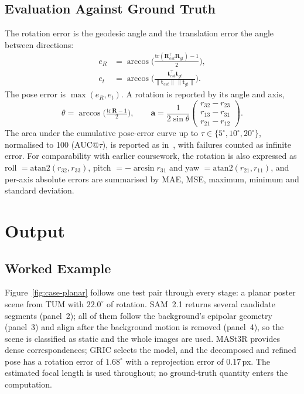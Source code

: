\documentclass[journal]{IEEEtran}
\newcommand{\R}{\mathbf{R}}
\newcommand{\tv}{\mathbf{t}}
\begin{document}
\subsection{Evaluation Against Ground Truth}
The rotation error is the geodesic angle and the translation error the angle between directions:
\begin{align}
  e_R &= \arccos\!\Big(\tfrac{\mathrm{tr}(\R_{est}^\top\R_{gt})-1}{2}\Big),\\
  e_t &= \arccos\!\Big(\tfrac{\tv_{est}^\top\tv_{gt}}{\|\tv_{est}\|\,\|\tv_{gt}\|}\Big).
\end{align}
The pose error is $\max(e_R,e_t)$. A rotation is reported by its angle and axis,
\begin{equation}
  \theta=\arccos\!\Big(\tfrac{\mathrm{tr}\,\R-1}{2}\Big),\qquad \mathbf{a}=\frac{1}{2\sin\theta}\begin{pmatrix}r_{32}-r_{23}\\ r_{13}-r_{31}\\ r_{21}-r_{12}\end{pmatrix}.
\end{equation} The area under the cumulative pose-error curve up to $\tau\in\{5^\circ,10^\circ,20^\circ\}$, normalised to 100 (AUC@$\tau$), is reported as in~\cite{superglue,loftr}, with failures counted as infinite error. For comparability with earlier coursework, the rotation is also expressed as roll $=\mathrm{atan2}(r_{32},r_{33})$, pitch $=-\arcsin r_{31}$ and yaw $=\mathrm{atan2}(r_{21},r_{11})$, and per-axis absolute errors are summarised by MAE, MSE, maximum, minimum and standard deviation.

\section{Output}

\subsection{Worked Example}
Figure~\ref{fig:case-planar} follows one test pair through every stage: a planar poster scene from TUM with $22.0^\circ$ of rotation. SAM~2.1 returns several candidate segments (panel~2); all of them follow the background's epipolar geometry (panel~3) and align after the background motion is removed (panel~4), so the scene is classified as static and the whole images are used. MASt3R provides dense correspondences; GRIC selects the model, and the decomposed and refined pose has a rotation error of $1.68^\circ$ with a reprojection error of 0.17\,px. The estimated focal length is used throughout; no ground-truth quantity enters the computation.
\end{document}
